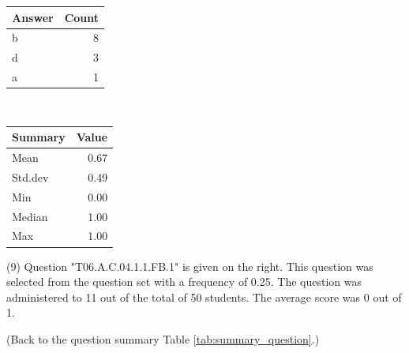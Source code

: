 \documentclass[12pt,english,nohyper]{tufte-handout}\usepackage[]{graphicx}\usepackage[]{color}
\begin{document}
\begin{center}%
\begin{tabular}{lr}
  \hline
Answer & Count \\ 
  \hline
b &   8 \\ 
  d &   3 \\ 
  a &   1 \\ 
   \hline
\end{tabular}
~~~~~~~~%
\begin{tabular}{lr}
  \hline
Summary & Value \\ 
  \hline
Mean & 0.67 \\ 
  Std.dev & 0.49 \\ 
  Min & 0.00 \\ 
  Median & 1.00 \\ 
  Max & 1.00 \\ 
   \hline
\end{tabular}
\end{center}\newpage{} (9) Question "T06.A.C.04.1.1.FB.1" is given on the right. This question was selected from the question set with a frequency of 0.25. The question was administered to 11 out of the total of 50 students. The average score was 0 out of 1.

 (Back to the question summary Table \ref{tab:summary_question}.)
\end{document}

